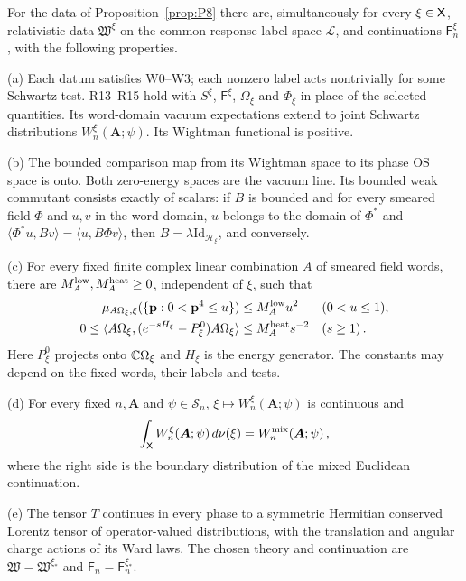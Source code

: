 \begin{proposition}\label{prop:P9}
For the data of Proposition~\ref{prop:P8} there are, simultaneously for every $\xi\in\mathsf{X}$, relativistic data $\mathfrak W^\xi$ on the common response label space $\mathcal L$, and continuations $\mathsf F_n^\xi$, with the following properties.

(a) Each datum satisfies W0–W3; each nonzero label acts nontrivially for some Schwartz test. R13–R15 hold with $S^\xi$, $\mathsf F^\xi$, $\Omega_\xi$ and $\Phi_\xi$ in place of the selected quantities. Its word-domain vacuum expectations extend to joint Schwartz distributions $W_n^\xi(\boldsymbol A;\psi)$. Its Wightman functional is positive.

(b) The bounded comparison map from its Wightman space to its phase OS space is onto. Both zero-energy spaces are the vacuum line. Its bounded weak commutant consists exactly of scalars: if $B$ is bounded and for every smeared field $\Phi$ and $u,v$ in the word domain, $u$ belongs to the domain of $\Phi^*$ and $\langle\Phi^*u,Bv\rangle=\langle u,B\Phi v\rangle$, then $B=\lambda\mathrm{Id}_{\mathcal H_\xi}$, and conversely.

(c) For every fixed finite complex linear combination $A$ of smeared field words, there are $M_A^{\rm low},M_A^{\rm heat}\ge0$, independent of $\xi$, such that
\begin{equation}\label{eq:P9-1}
\begin{aligned}
\mu_{A\Omega_\xi,\xi}(\{\mathbf p:0<\mathbf p^4\le u\})&\le M_A^{\rm low}u^2&& (0<u\le1),\\
0\le\langle A\Omega_\xi,(e^{-sH_\xi}-P^0_\xi)A\Omega_\xi\rangle&\le M_A^{\rm heat}s^{-2}&& (s\ge1)\,.
\end{aligned}
\end{equation}
Here $P^0_\xi$ projects onto $\mathbb{C}\Omega_\xi$ and $H_\xi$ is the energy generator. The constants may depend on the fixed words, their labels and tests.

(d) For every fixed $n,\boldsymbol A$ and $\psi\in\mathcal S_n$, $\xi\mapsto W_n^\xi(\boldsymbol A;\psi)$ is continuous and
\begin{equation}\label{eq:P9-2}
\int_{\mathsf{X}}W_n^\xi(\boldsymbol A;\psi)\,d\nu(\xi)=W_n^{\mathrm{mix}}(\boldsymbol A;\psi)\,,
\end{equation}
where the right side is the boundary distribution of the mixed Euclidean continuation.

(e) The tensor $T$ continues in every phase to a symmetric Hermitian conserved Lorentz tensor of operator-valued distributions, with the translation and angular charge actions of its Ward laws. The chosen theory and continuation are $\mathfrak W=\mathfrak W^{\xi_*}$ and $\mathsf F_n=\mathsf F_n^{\xi_*}$.
\end{proposition}

